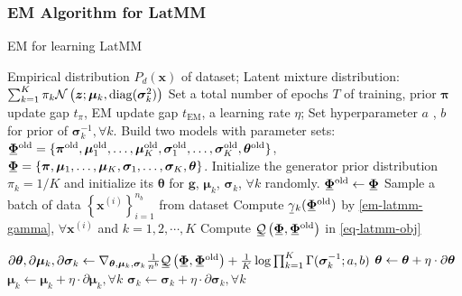 \subsubsection{EM Algorithm for LatMM}
\begin{algorithm}[t]
  \caption{EM for learning LatMM}\label{flow-algo-sem}
  \begin{algorithmic}[1]
     Empirical distribution $P_d(\bm{x})$ of dataset;
    \STATE Latent mixture distribution: 
    \STATE $\sum_{k=1}^{K}\pi_k \mathcal{N}\left(\bm{z}; \bm{\mu}_k, \mathrm{diag}(\bm{\sigma}_k^2)\right)$
    \STATE Set a total number of epochs $T$ of training, prior $\bm{\pi}$ update gap $t_{\pi}$, EM update gap $t_{\mathrm{EM}}$, a learning rate $\eta$; Set hyperparameter $a$ , $b$ for prior of
    $\bm{\sigma}_k^{-1}, \forall k$.
    \STATE Build two models with parameter sets:
    \STATE $\ubar{\bm{\Phi}}^{\mathrm{old}}=\{ \bm{\pi}^{\mathrm{old}},
    \bm{\mu}_1^{\mathrm{old}},\hdots, \bm{\mu}_K^{\mathrm{old}}, \bm{\sigma}_1^{\mathrm{old}},\hdots,
    \bm{\sigma}_K^{\mathrm{old}}, \bm{\theta}^{\mathrm{old}} \}$,
    \STATE $\ubar{\bm{\Phi}} = \{ \bm{\pi},
    \bm{\mu}_1,\hdots, \bm{\mu}_K, \bm{\sigma}_1,\hdots,
    \bm{\sigma}_K, \bm{\theta} \}$.
    \STATE Initialize the generator prior distribution $\pi_k = 1/K$ and initialize its $\bm{\theta}$ for $\bm{g}$, $\bm{\mu}_k$, $\bm{\sigma}_k$, $\forall k$ randomly.
    \STATE $\ubar{\bm{\Phi}}^{\mathrm{old}} \gets \ubar{\bm{\Phi}}$
    \STATE Sample a batch of data $\left\{ \bm{x}^{(i)}
    \right\}_{i=1}^{n_b}$ from dataset
    \STATE Compute $\ubar{\gamma}_k(\ubar{\bm{\Phi}}^{\mathrm{old}})$ by \autoref{em-latmm-gamma}, $\forall \bm{x}^{(i)}$ and $k=1, 2, \cdots, K$ %
    \STATE Compute
    $\ubar{\Qq}\left(\ubar{\bm{\Phi}},\ubar{\bm{\Phi}}^{\mathrm{old}}\right)$ in \autoref{eq-latmm-obj}%

    \STATE $\partial{\bm{\th}}, \partial{\bm{\mu}_k}, \partial{\bm{\sigma}_k}\gets 
    \nabla_{\bm{\theta}, \bm{\mu}_k, \bm{\sigma}_k} 
    \frac{1}{n^{b}}\ubar{\Qq}\left(\ubar{\bm{\Phi}},\ubar{\bm{\Phi}}^{\mathrm{old}}\right)
    +\frac{1}{K}
    \log\prod_{k=1}^K
    \Gamma(\bm{\sigma}_k^{-1};
    a, b)$ %
    \STATE $\bm{\theta} \gets \bm{\theta} + \eta \cdot \partial{\bm{\theta}}$
    \STATE $\bm{\mu}_k \gets \bm{\mu}_k + \eta \cdot \partial{\bm{\mu}_k}, \forall k$
    \STATE $\bm{\sigma}_k \gets \bm{\sigma}_k + \eta \cdot \partial{\bm{\sigma}_k},
    \forall k$
    \ENDFOR


\end{algorithmic}
\end{algorithm}
